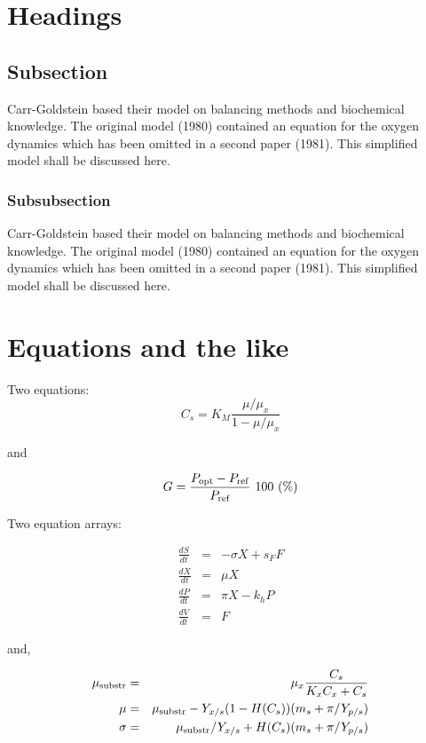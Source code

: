 \documentclass[dvips,aoas,preprint]{imsart}
\numberwithin{equation}{section}
\theoremstyle{plain}
\begin{document}
\section{Headings}

\subsection{Subsection}
Carr-Goldstein based their model on balancing methods and
biochemical know\-ledge. The original model (1980) contained an equation for the
oxygen dynamics which has been omitted in a second paper
(1981). This simplified model shall be discussed here.

\subsubsection{Subsubsection}
Carr-Goldstein
based their model on balancing methods and
biochemical know\-ledge. The original model (1980) contained an equation for the
oxygen dynamics which has been omitted in a second paper
(1981). This simplified model shall be discussed here.

\section{Equations and the like}

Two equations:
\begin{equation}
    C_{s}  =  K_{M} \frac{\mu/\mu_{x}}{1-\mu/\mu_{x}} \label{ccs}
\end{equation}

and

\begin{equation}
    G = \frac{P_{\rm opt} - P_{\rm ref}}{P_{\rm ref}} \mbox{\ }100 \mbox{\ }(\%)
\end{equation}

Two equation arrays:

\begin{eqnarray}
  \frac{dS}{dt} & = & - \sigma X + s_{F} F\\
  \frac{dX}{dt} & = &   \mu    X\\
  \frac{dP}{dt} & = &   \pi    X - k_{h} P\\
  \frac{dV}{dt} & = &   F
\end{eqnarray}

and,

\begin{eqnarray}
 \mu_{\rm substr} & = & \mu_{x} \frac{C_{s}}{K_{x}C_{x}+C_{s}}  \\
 \mu              & = & \mu_{\rm substr} - Y_{x/s}(1-H(C_{s}))(m_{s}+\pi /Y_{p/s}) \\
 \sigma           & = & \mu_{\rm substr}/Y_{x/s}+ H(C_{s}) (m_{s}+ \pi /Y_{p/s})
\end{eqnarray}
\end{document}
